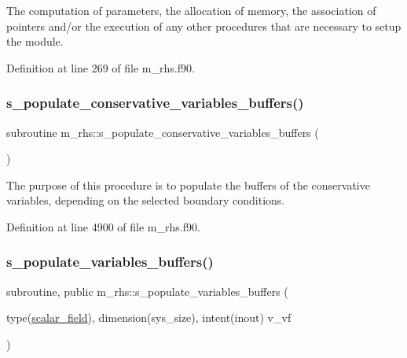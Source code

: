 The computation of parameters, the allocation of memory, the association of pointers and/or the execution of any other procedures that are necessary to setup the module. 



Definition at line 269 of file m\+\_\+rhs.\+f90.

\mbox{\label{namespacem__rhs_a2647dbdf6b09315564ef060e1f49df0d}} 
\subsubsection{\texorpdfstring{s\+\_\+populate\+\_\+conservative\+\_\+variables\+\_\+buffers()}{s\_populate\_conservative\_variables\_buffers()}}
{\footnotesize\ttfamily subroutine m\+\_\+rhs\+::s\+\_\+populate\+\_\+conservative\+\_\+variables\+\_\+buffers (\begin{DoxyParamCaption}{ }\end{DoxyParamCaption})}



The purpose of this procedure is to populate the buffers of the conservative variables, depending on the selected boundary conditions. 



Definition at line 4900 of file m\+\_\+rhs.\+f90.

\mbox{\label{namespacem__rhs_a5735aa0dc9d5759c2056a79d4a8c484b}} 
\subsubsection{\texorpdfstring{s\+\_\+populate\+\_\+variables\+\_\+buffers()}{s\_populate\_variables\_buffers()}}
{\footnotesize\ttfamily subroutine, public m\+\_\+rhs\+::s\+\_\+populate\+\_\+variables\+\_\+buffers (\begin{DoxyParamCaption}\item[{type(\hyperlink{structm__derived__types_1_1scalar__field}{scalar\+\_\+field}), dimension(sys\+\_\+size), intent(inout)}]{v\+\_\+vf }\end{DoxyParamCaption})}



